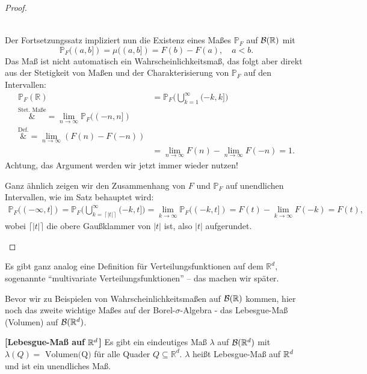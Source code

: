 \begin{proof}
\begin{enumerate}[label=(\roman*)]
\begin{itemize}
\begin{align*}
			\end{align*}			
		\end{itemize}
	Der Fortsetzungssatz impliziert nun die Existenz eines Maßes $\mathbb{P}_F$ auf $\mathcal{B}(\mathbb{R})$ mit \[\mathbb{P}_F((a,b]) = \mu((a,b]) = F(b) - F(a),\quad a<b.\] Das Ma\ss{} ist nicht automatisch ein Wahrscheinlichkeitsma\ss, das folgt aber direkt aus der Stetigkeit von Ma\ss en und der Charakterisierung von $\mathbb P_F$ auf den Intervallen:
		\begin{align*}
			\mathbb{P}_F(\mathbb{R}) &= \mathbb{P}_F\Big(\bigcup\limits_{k = 1}^{\infty} (-k,k]\Big)\\
			 \overset{\text{Stet. Ma\ss e}}&{=} \lim\limits_{n \to \infty} \mathbb{P}_F((-n,n])\\
			\overset{\text{Def.}}&{=} \lim\limits_{n \to \infty} (F(n) - F(-n))\\
			& = \lim\limits_{n \to \infty} F(n) - \lim\limits_{n \to \infty} F(-n)=1.
		\end{align*}
		Achtung, das Argument werden wir jetzt immer wieder nutzen!\smallskip
		
		Ganz \"ahnlich zeigen wir den Zusammenhang von $F$ und $\mathbb P_F$ auf unendlichen Intervallen, wie im Satz behauptet wird:
		\begin{gather*}
			\mathbb{P}_F((-\infty,t]) = \mathbb{P}_F\Big(\bigcup\limits_{k = \left \lceil{|t|}\right \rceil }^{\infty} (-k,t]\Big) = \lim\limits_{k \to \infty} \mathbb{P}_F((-k,t])=F(t)-\lim_{k\to\infty} F(-k)=F(t),
		\end{gather*}
		wobei $\lceil |t|\rceil$ die obere Gau\ss klammer von $|t|$ ist, also $|t|$ aufgerundet.
	\end{enumerate}
\end{proof}

\begin{bem} 
	Es gibt ganz analog eine Definition für Verteilungsfunktionen auf dem $\mathbb{R}^d$, sogenannte \enquote{multivariate Verteilungsfunktionen} -- das machen wir später.
\end{bem}
Bevor wir zu Beispielen von Wahrscheinlichkeitsma\ss en auf $\mathcal B(\mathbb{R})$ kommen, hier noch das zweite wichtige Ma\ss es auf der Borel-$\sigma$-Algebra - das Lebesgue-Ma\ss{} (Volumen) auf $\mathcal B(\mathbb{R}^d)$.
\begin{satz}
 \textbf{[Lebesgue-Ma\ss{} auf $\mathbb{R}^d$]}
	Es gibt ein eindeutiges Maß $\lambda$ auf $\mathcal B(\mathbb{R}^d)$ mit $\lambda(Q)=\text{ Volumen(Q)}$ für alle Quader $Q \subseteq \mathbb{R}^d$. $\lambda$ heißt Lebesgue-Maß auf $\mathbb{R}^d$ und ist ein unendliches Ma\ss.
\end{satz}


